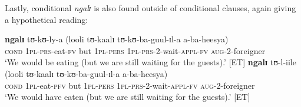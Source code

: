 Lastly, conditional \textit{ngalɪ} is also found outside of conditional clauses, again giving a hypothetical reading:
\begin{exe}
\ex
\gll \textbf{ngalɪ} tʊ-kʊ-ly-a (looli tʊ-kaalɪ tʊ-kʊ-ba-guul-ɪl-a a-ba-heesya)\\
\textsc{cond} 1\textsc{pl}-\textsc{prs}-eat-\textsc{fv} \phantom{(}but 1\textsc{pl}-\textsc{pers} \textsc{1pl}-\textsc{prs}-2-wait-\textsc{appl}-\textsc{fv} \textsc{aug}-2-foreigner\\
\glt \lq We would be eating (but we are still waiting for the guests).' [ET]
\ex
\gll \textbf{ngalɪ} tʊ-l-iile (looli tʊ-kaalɪ tʊ-kʊ-ba-guul-ɪl-a a-ba-heesya)\\
\textsc{cond} \textsc{1pl}-eat-\textsc{pfv}  \phantom{(}but \textsc{1pl}-\textsc{pers} \textsc{1pl}-\textsc{prs}-2-wait-\textsc{appl}-\textsc{fv} \textsc{aug}-2-foreigner\\
\glt \lq We would have eaten (but we are still waiting for the guests).' [ET]
\end{exe}
